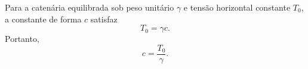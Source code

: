 Para a catenária equilibrada sob peso unitário $\gamma$ e tensão horizontal constante $T_0$, a constante de forma $c$ satisfaz
\[
T_0 = \gamma c.
\]
Portanto,
\[
c = \frac{T_0}{\gamma}.
\]